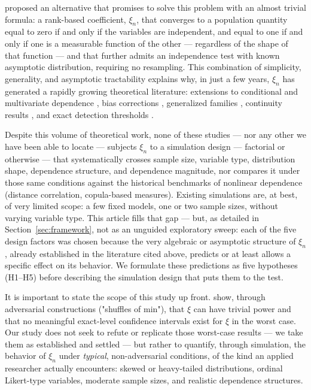 \documentclass[article]{ajs}
\begin{document}
\citet{chatterjee2021} proposed an alternative that promises to solve
this problem with an almost trivial formula: a rank-based coefficient,
$\xi_n$, that converges to a population quantity equal to zero if and
only if the variables are independent, and equal to one if and only if
one is a measurable function of the other --- regardless of the shape
of that function --- and that further admits an independence test with
known asymptotic distribution, requiring no resampling. This
combination of simplicity, generality, and asymptotic tractability
explains why, in just a few years, $\xi_n$ has generated a rapidly
growing theoretical literature: extensions to conditional and
multivariate dependence \citep{azadkia2021}, bias corrections
\citep{dalitz2024}, generalized families \citep{gao2024}, continuity
results \citep{ansari2026, bucher2025}, and exact detection thresholds
\citep{auddy2024}.

Despite this volume of theoretical work, none of these studies --- nor
any other we have been able to locate --- subjects $\xi_n$ to a
simulation design --- factorial or otherwise --- that systematically
crosses sample size, variable type, distribution shape, dependence
structure, and dependence magnitude, nor compares it under those same
conditions against the historical benchmarks of nonlinear dependence
(distance correlation, copula-based measures). Existing simulations
are, at best, of very limited scope: a few fixed models, one or two
sample sizes, without varying variable type. This article fills that
gap --- but, as detailed in Section~\ref{sec:framework}, not as an
unguided exploratory sweep: each of the five design factors was chosen
because the very algebraic or asymptotic structure of $\xi_n$, already
established in the literature cited above, predicts or at least
allows a specific effect on its behavior. We formulate these
predictions as five hypotheses (H1--H5) before describing the
simulation design that puts them to the test.

It is important to state the scope of this study up front.
\citet{bucher2025} show, through adversarial constructions ("shuffles
of min"), that $\xi$ can have trivial power and that no meaningful
exact-level confidence intervals exist for $\xi$ in the worst case. Our
study does not seek to refute or replicate those worst-case results ---
we take them as established and settled --- but rather to quantify,
through simulation, the behavior of $\xi_n$ under \emph{typical},
non-adversarial conditions, of the kind an applied researcher actually
encounters: skewed or heavy-tailed distributions, ordinal Likert-type
variables, moderate sample sizes, and realistic dependence structures.
\end{document}
